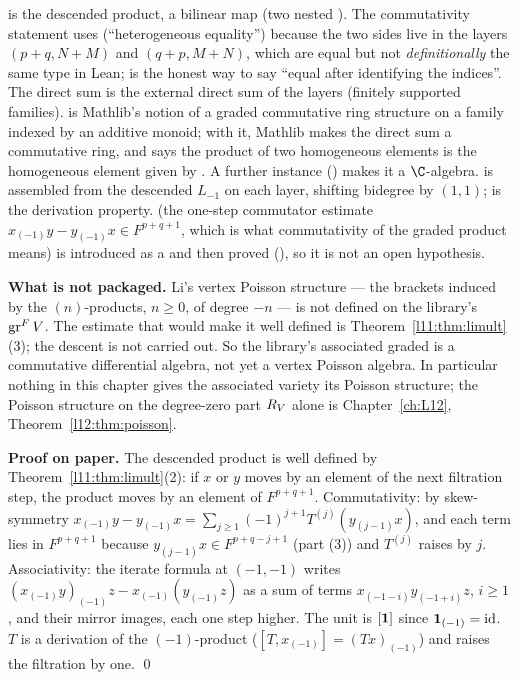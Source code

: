\begin{dictionary}
 is the descended product, a bilinear map (two nested ). The
commutativity statement  uses  (``heterogeneous equality'') because
the two sides live in the layers $(p+q,N+M)$ and $(q+p,M+N)$, which are equal but not \emph{definitionally}
the same type in Lean;  is the honest way to say ``equal after identifying the indices''. The
direct sum  is the external direct sum of the layers (finitely supported families).
 is Mathlib's notion of a graded commutative ring structure on a family indexed by
an additive monoid; with it, Mathlib makes the direct sum a commutative ring, and
\allowbreak{}\allowbreak{}\allowbreak{} says the product of two homogeneous elements is the homogeneous element
given by . A further instance () makes it a
$\C$-algebra.  is assembled from the descended $L_{-1}$ on each layer,
shifting bidegree by $(1,1)$;  is the derivation property. 
(the one-step commutator estimate $x_{(-1)}y - y_{(-1)}x\in F^{p+q+1}$, which is what commutativity of the
graded product means) is introduced as a  and then proved
(\allowbreak{}), so it is not an open hypothesis.

\textbf{What is not packaged.} Li's vertex Poisson structure --- the brackets induced by the $(n)$-products,
$n\ge0$, of degree $-n$ --- is not defined on the library's $\operatorname{gr}^FV$. The estimate that would make it
well defined is Theorem~\ref{l11:thm:limult}(3); the descent is not carried out. So the library's
associated graded is a commutative differential algebra, not yet a vertex Poisson algebra. In particular nothing in this chapter
gives the associated variety its Poisson structure; the Poisson structure on the degree-zero part $R_V$ alone is
Chapter~\ref{ch:L12}, Theorem~\ref{l12:thm:poisson}.
\end{dictionary}

\textbf{Proof on paper.} The descended product is well defined by Theorem~\ref{l11:thm:limult}(2): if $x$
or $y$ moves by an element of the next filtration step, the product moves by an element of $F^{p+q+1}$.
Commutativity: by skew-symmetry $x_{(-1)}y - y_{(-1)}x = \sum_{j\ge1}(-1)^{j+1}T^{(j)}(y_{(j-1)}x)$, and
each term lies in $F^{p+q+1}$ because $y_{(j-1)}x\in F^{p+q-j+1}$ (part (3)) and $T^{(j)}$ raises by $j$.
Associativity: the iterate formula at $(-1,-1)$ writes $(x_{(-1)}y)_{(-1)}z - x_{(-1)}(y_{(-1)}z)$ as a
sum of terms $x_{(-1-i)}y_{(-1+i)}z$, $i\ge1$, and their mirror images, each one step higher. The unit is
$[\mathbf{1}]$ since $\mathbf{1}_{(-1)} = \mathrm{id}$. $T$ is a derivation of the $(-1)$-product
($[T,x_{(-1)}] = (Tx)_{(-1)}$) and raises the filtration by one. \qed

